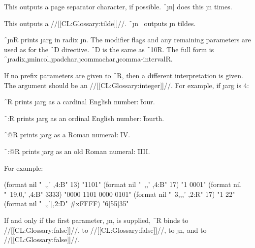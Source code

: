 


This outputs a page separator character, if possible.
\f{~\j{n}|} does this \j{n} times.

\endsubsubsection%




This outputs a //[[CL:Glossary:tilde]]//.  \f{~\j{n}~} outputs \j{n} tildes.

\endsubsubsection%

\endsubsection%





\f{~\j{n}R} prints \j{arg} in radix \j{n}.
The modifier flags and any remaining parameters are used as for
the \f{~D} directive.
\f{~D} is the same as \f{~10R}.  
The full form is 
\f{~\j{radix},\j{mincol},\j{padchar},\j{commachar},\j{comma-interval}R}.


If no prefix parameters are given to \f{~R}, then a different
interpretation is given.  The argument should be an //[[CL:Glossary:integer]]//.
For example, if \j{arg} is 4:


\beginlist
\itemitem{\bull}
\f{~R} prints \j{arg} as a cardinal English number: \f{four}.


\itemitem{\bull}
\f{~:R} prints \j{arg} as an ordinal English number: \f{fourth}.


\itemitem{\bull}   
\f{~@R} prints \j{arg} as a Roman numeral: \f{IV}.


\itemitem{\bull}      
\f{~:@R} prints \j{arg} as an old Roman numeral: \f{IIII}.
\endlist

For example:

\code
 (format nil "~,,' ,4:B" 13) \EV "1101"
 (format nil "~,,' ,4:B" 17) \EV "1 0001"
 (format nil "~19,0,' ,4:B" 3333) \EV "0000 1101 0000 0101"
 (format nil "~3,,,' ,2:R" 17) \EV "1 22"
 (format nil "~,,'|,2:D" #xFFFF) \EV  "6|55|35"
\endcode


If and only if the first parameter, \j{n}, is supplied,
\f{~R} binds
      to //[[CL:Glossary:false]]//,
      to //[[CL:Glossary:false]]//, 
      to \j{n},
 and  to //[[CL:Glossary:false]]//.


